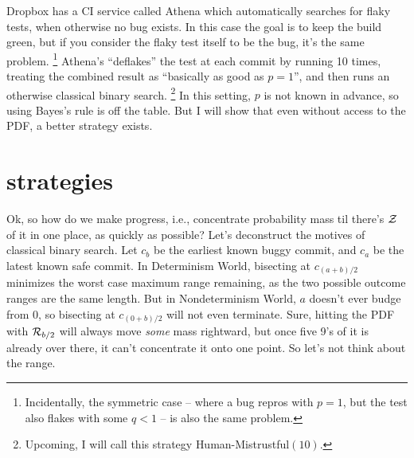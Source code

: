 \documentclass[11pt]{sigplanconf}
\begin{document}
Dropbox has a CI service called Athena \cite{athena}
which automatically searches for flaky tests, when otherwise no bug exists.
In this case the goal is to keep the build green, but if you consider the flaky test itself to be the bug, it's the same problem.%
\footnote{Incidentally, the symmetric case
-- where a bug repros with $p=1$, but the test also flakes with some $q<1$ --
is also the same problem.}
Athena's ``deflakes'' the test at each commit by running 10 times,
treating the combined result as ``basically as good as $p=1$'',
and then runs an otherwise classical binary search.%
\footnote{Upcoming, I will call this strategy \textsf{Human-Mistrustful}$(10)$.}
In this setting, $p$ is not known in advance, so using Bayes's rule is off the table.
But I will show that even without access to the PDF, a better strategy exists. %


\section{strategies}

Ok, so how do we
make progress,
i.e., concentrate probability mass til there's $\mathcal{Z}$ of it in one place,
as quickly as possible?
%
Let's deconstruct the motives of classical binary search.
Let $c_b$ be the earliest known buggy commit, and $c_a$ be the latest known safe commit.
In Determinism World, bisecting at $c_{(a+b)/2}$
minimizes the worst case maximum range remaining,
as the two possible outcome ranges are the same length.
But in Nondeterminism World, $a$ doesn't ever budge from $0$,
so bisecting at $c_{(0+b)/2}$ will not even terminate.
Sure, hitting the PDF with
$\mathcal{R}_{b/2}$
will always move {\it some} mass rightward,
but once five 9's of it is already over there,
it can't concentrate it onto one point.
So let's not think about the range.
\end{document}
